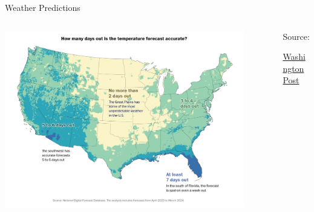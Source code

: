 \documentclass[aspectratio=169,t,11pt,table]{beamer}
\begin{document}
\begin{frame}{Weather Predictions}
  \begin{columns}[T]
    \begin{column}{.7\textwidth}\vspace*{-\bigskipamount}
      \includegraphics[width = 0.9\textwidth]{figures/how_reliable_weather_forecasts.png}
    \end{column}
    \begin{column}{.3\textwidth}
      Source:

      \href{https://www.washingtonpost.com/climate-environment/interactive/2024/how-accurate-is-the-weather-forecast/}{Washington Post}
    \end{column}
  \end{columns}
\end{frame}
\end{document}
